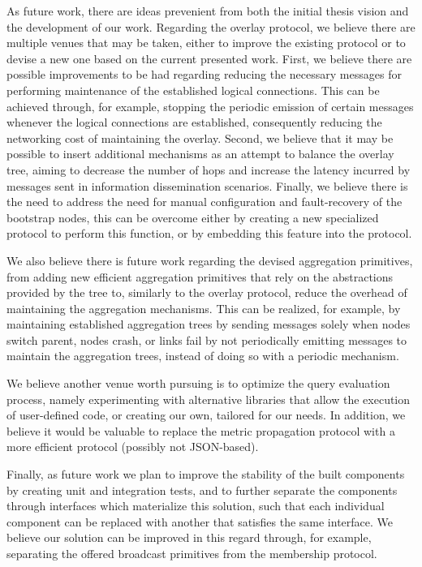 As future work, there are ideas prevenient from both the initial thesis vision and the development of our work. 
Regarding the overlay protocol, we believe there are multiple venues that may be taken, either to improve the existing protocol or to devise a new one based on the current presented work. First, we believe there are possible improvements to be had regarding reducing the necessary messages for performing maintenance of the established logical connections. This can be achieved through, for example, stopping the periodic emission of certain messages whenever the logical connections are established, consequently reducing the networking cost of maintaining the overlay. Second, we believe that it may be possible to insert additional mechanisms as an attempt to balance the overlay tree, aiming to decrease the number of hops and increase the latency incurred by messages sent in information dissemination scenarios. Finally, we believe there is the need to address the need for manual configuration and fault-recovery of the bootstrap nodes, this can be overcome either by creating a new specialized protocol to perform this function, or by embedding this feature into the protocol.

We also believe there is future work regarding the devised aggregation primitives, from adding new efficient aggregation primitives that rely on the abstractions provided by the tree to, similarly to the overlay protocol, reduce the overhead of maintaining the aggregation mechanisms. This can be realized, for example, by maintaining established aggregation trees by sending messages solely when nodes switch parent, nodes crash, or links fail by not periodically emitting messages to maintain the aggregation trees, instead of doing so with a periodic mechanism.

We believe another venue worth pursuing is to optimize the query evaluation process, namely experimenting with alternative libraries that allow the execution of user-defined code, or creating our own, tailored for our needs. In addition, we believe it would be valuable to replace the metric propagation protocol with a more efficient protocol (possibly not JSON-based).

Finally, as future work we plan to improve the stability of the built components by creating unit and integration tests, and to further separate the components through interfaces which materialize this solution, such that each individual component can be replaced with another that satisfies the same interface. We believe our solution can be improved in this regard through, for example, separating the offered broadcast primitives from the membership protocol. 